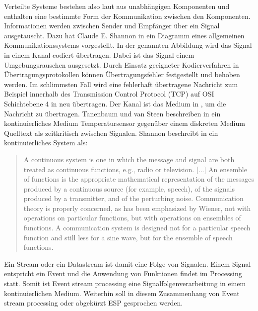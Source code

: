Verteilte Systeme bestehen also laut  aus unabhängigen Komponenten und enthalten eine bestimmte Form der Kommunikation zwischen den Komponenten. Informationen werden zwischen Sender und Empfänger über ein Signal ausgetauscht. Dazu hat Claude E. Shannon in  ein Diagramm eines allgemeinen Kommunikationssystems vorgestellt. In der genannten Abbildung wird das Signal in einem Kanal codiert übertragen. Dabei ist das Signal einem Umgebungsrauschen ausgesetzt. Durch Einsatz geeigneter Kodierverfahren in Übertragungsprotokollen können Übertragungsfehler festgestellt und behoben werden. Im schlimmsten Fall wird eine fehlerhaft übertragene Nachricht zum Beispiel innerhalb des Transmission Control Protocol (TCP) auf OSI Schichtebene 4 in  neu übertragen. Der Kanal ist das Medium in , um die Nachricht zu übertragen. %
Tanenbaum und van Steen beschreiben in  ein kontinuierliches Medium Temperatursensor gegenüber einem diskreten Medium Quelltext als zeitkritisch zwischen Signalen. %
Shannon beschreibt in  ein kontinuierliches System als:

\begin{quote}
A continuous system is one in which the message and signal are both treated as continuous functions, e.g., radio or television. [...]
An ensemble of functions is the appropriate mathematical representation of the messages produced by
a continuous source (for example, speech), of the signals produced by a transmitter, and of the perturbing
noise. Communication theory is properly concerned, as has been emphasized by Wiener, not with operations
on particular functions, but with operations on ensembles of functions. A communication system is designed
not for a particular speech function and still less for a sine wave, but for the ensemble of speech functions.
\end{quote}

Ein Stream oder ein Datastream ist damit eine Folge von Signalen. Einem Signal entspricht ein Event und die Anwendung von Funktionen findet im Processing statt. Somit ist Event stream processing eine Signalfolgenverarbeitung in einem kontinuierlichen Medium. Weiterhin soll in diesem Zusammenhang von Event stream processing oder abgekürzt ESP gesprochen werden.

